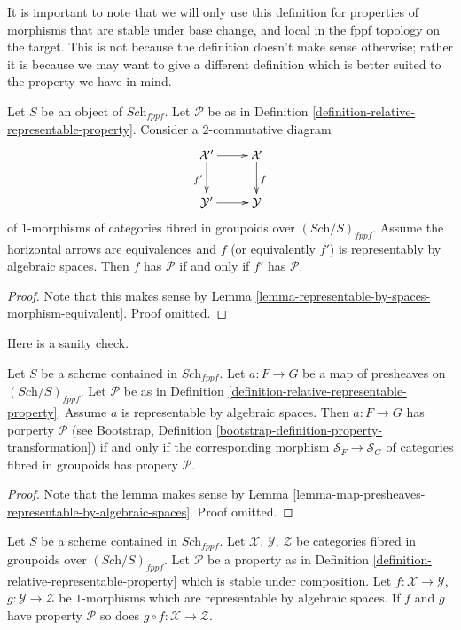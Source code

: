 \noindent
It is important to note that we will only use this definition for
properties of morphisms that are stable under base change, and
local in the fppf topology on the target. This is
not because the definition doesn't make sense otherwise; rather it
is because we may want to give a different definition which is
better suited to the property we have in mind.

\begin{lemma}
\label{lemma-property-morphism-equivalent}
Let $S$ be an object of $\textit{Sch}_{fppf}$.
Let $\mathcal{P}$ be as in
Definition \ref{definition-relative-representable-property}.
Consider a $2$-commutative diagram
$$
\xymatrix{
\mathcal{X}' \ar[r] \ar[d]_{f'} & \mathcal{X} \ar[d]^f \\
\mathcal{Y}' \ar[r] & \mathcal{Y}
}
$$
of $1$-morphisms of categories fibred in groupoids over
$(\textit{Sch}/S)_{fppf}$.
Assume the horizontal arrows are equivalences and $f$ (or equivalently $f'$)
is representably by algebraic spaces.
Then $f$ has $\mathcal{P}$ if and only if $f'$ has $\mathcal{P}$.
\end{lemma}

\begin{proof}
Note that this makes sense by
Lemma \ref{lemma-representable-by-spaces-morphism-equivalent}.
Proof omitted.
\end{proof}

\noindent
Here is a sanity check.

\begin{lemma}
\label{lemma-map-presheaves-representable-by-spaces-transformation-property}
Let $S$ be a scheme contained in $\textit{Sch}_{fppf}$.
Let $a : F \to G$ be a map of presheaves on $(\textit{Sch}/S)_{fppf}$.
Let $\mathcal{P}$ be as in
Definition \ref{definition-relative-representable-property}.
Assume $a$ is representable by algebraic spaces.
Then $a : F \to G$ has porperty $\mathcal{P}$ (see
Bootstrap, Definition \ref{bootstrap-definition-property-transformation})
if and only if the corresponding morphism
$\mathcal{S}_F \to \mathcal{S}_G$ of categories fibred in groupoids
has propery $\mathcal{P}$.
\end{lemma}

\begin{proof}
Note that the lemma makes sense by
Lemma \ref{lemma-map-presheaves-representable-by-algebraic-spaces}.
Proof omitted.
\end{proof}

\begin{lemma}
\label{lemma-composition-representable-transformations-property}
Let $S$ be a scheme contained in $\textit{Sch}_{fppf}$.
Let $\mathcal{X}$, $\mathcal{Y}$, $\mathcal{Z}$ be categories fibred
in groupoids over $(\textit{Sch}/S)_{fppf}$.
Let $\mathcal{P}$ be a property as in
Definition \ref{definition-relative-representable-property}
which is stable under composition.
Let $f : \mathcal{X} \to \mathcal{Y}$,
$g : \mathcal{Y} \to \mathcal{Z}$ be $1$-morphisms which
are representable by algebraic spaces.
If $f$ and $g$ have property $\mathcal{P}$ so does
$g \circ f : \mathcal{X} \to \mathcal{Z}$.
\end{lemma}

